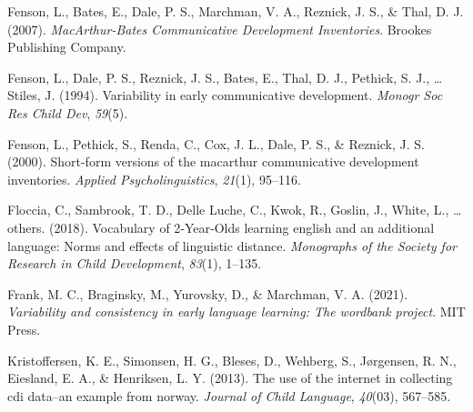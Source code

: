 \documentclass[
  english,
  man]{apa7}
\begin{document}
\leavevmode\hypertarget{ref-fenson2007}{}%
Fenson, L., Bates, E., Dale, P. S., Marchman, V. A., Reznick, J. S., \& Thal, D. J. (2007). \emph{MacArthur-Bates Communicative Development Inventories}. Brookes Publishing Company.

\leavevmode\hypertarget{ref-fenson1994}{}%
Fenson, L., Dale, P. S., Reznick, J. S., Bates, E., Thal, D. J., Pethick, S. J., \ldots{} Stiles, J. (1994). Variability in early communicative development. \emph{Monogr Soc Res Child Dev}, \emph{59}(5).

\leavevmode\hypertarget{ref-fenson2000b}{}%
Fenson, L., Pethick, S., Renda, C., Cox, J. L., Dale, P. S., \& Reznick, J. S. (2000). Short-form versions of the macarthur communicative development inventories. \emph{Applied Psycholinguistics}, \emph{21}(1), 95--116.

\leavevmode\hypertarget{ref-floccia2018}{}%
Floccia, C., Sambrook, T. D., Delle Luche, C., Kwok, R., Goslin, J., White, L., \ldots{} others. (2018). Vocabulary of 2‐Year‐Olds learning english and an additional language: Norms and effects of linguistic distance. \emph{Monographs of the Society for Research in Child Development}, \emph{83}(1), 1--135.

\leavevmode\hypertarget{ref-Frank2021}{}%
Frank, M. C., Braginsky, M., Yurovsky, D., \& Marchman, V. A. (2021). \emph{Variability and consistency in early language learning: The wordbank project}. MIT Press.

\leavevmode\hypertarget{ref-kristoffersen2013}{}%
Kristoffersen, K. E., Simonsen, H. G., Bleses, D., Wehberg, S., Jørgensen, R. N., Eiesland, E. A., \& Henriksen, L. Y. (2013). The use of the internet in collecting cdi data--an example from norway. \emph{Journal of Child Language}, \emph{40}(03), 567--585.

\endgroup
\end{document}
